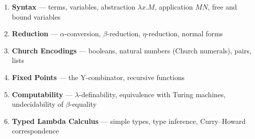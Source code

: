\begin{tcolorbox}[
  colback=amber!6,
  colframe=amber!40,
  arc=2pt,
  left=8pt, right=8pt, top=6pt, bottom=6pt,
  title={\small\textbf{Planned Content}},
  fonttitle=\small\bfseries
]
\small
\begin{enumerate}
  \item \textbf{Syntax} --- terms, variables, abstraction $\lambda x.M$,
        application $MN$, free and bound variables
  \item \textbf{Reduction} --- $\alpha$-conversion, $\beta$-reduction,
        $\eta$-reduction, normal forms
  \item \textbf{Church Encodings} --- booleans, natural numbers (Church numerals),
        pairs, lists
  \item \textbf{Fixed Points} --- the Y-combinator, recursive functions
  \item \textbf{Computability} --- $\lambda$-definability, equivalence with
        Turing machines, undecidability of $\beta$-equality
  \item \textbf{Typed Lambda Calculus} --- simple types, type inference,
        Curry--Howard correspondence
\end{enumerate}
\end{tcolorbox}


